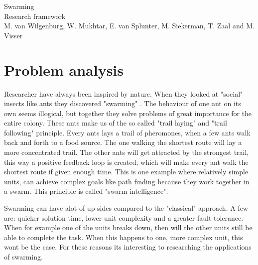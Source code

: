 \documentclass[10pt,a4paper]{article}
\begin{document}
\begin{titlepage}
    \centering
    \vfill
    {\Large
    Swarming\\
   
    {\small Research framework}\\
        
        \vskip2cm
        {\small M. van Wilgenburg, W. Mukhtar, E. van Splunter, M. Siekerman, T. Zaal and M. Visser}\\
    }    
    \vfill
    
    \vfill
    \vfill
\end{titlepage}

\newpage

\tableofcontents
\newpage


\section{Problem analysis}
Researcher have always been inspired by nature. When they looked at "social" insects like ants they discovered "swarming"\cite{swarmwiki} . The behaviour of one ant on its own seems illogical, but together they solve problems of great importance for the entire colony. These ants make us of the so called "trail laying" and "trail following" principle. Every ants lays a trail of pheromones, when a few ants walk back and forth to a food source. The one walking the shortest route will lay a more concentrated trail. The other ants will get attracted by the strongest trail, this way a positive feedback loop is created, which will make every ant walk the shortest route if given enough time. This is one example where relatively simple units, can achieve complex goals like path finding because they work together in a swarm. This principle is called "swarm intelligence"\cite{swarmintelligence}.

Swarming can have alot of up sides compared to the "classical" approach. A few are: quicker solution time, lower unit complexity and a greater fault tolerance\cite{swarmintelligence}. When for example one of the units breaks down, then will the other units still be able to complete the task. When this happens to one, more complex unit, this wont be the case. For these reasons its interesting to researching the applications of swarming.
\end{document}
